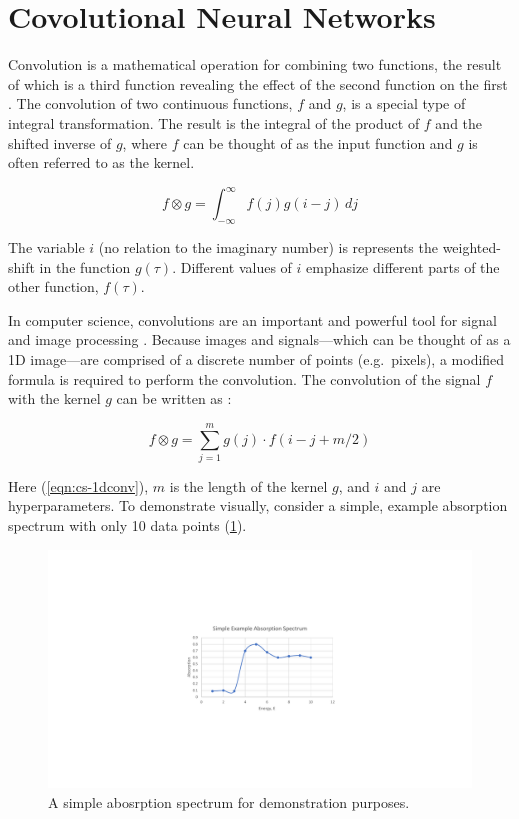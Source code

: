 \section{Covolutional Neural Networks}
Convolution is a mathematical operation for combining two functions, the result of which is a third function revealing the effect of the second function on the first \cite{Boas-mathmethods}. The convolution of two continuous functions, $ f $ and $ g $, is a special type of integral transformation. The result is the integral of the product of $ f $ and the shifted inverse of $ g $, where $ f $ can be thought of as the input function and $ g $ is often referred to as the kernel.

\begin{equation}
    f \otimes g = \int_{-\infty}^{\infty} f(j)g(i-j) \,dj 
\end{equation}

\noindent The variable $ i $ (no relation to the imaginary number) is represents the weighted-shift in the function $ g(\tau) $. Different values of $ i $ emphasize different parts of the other function, $ f(\tau) $.  

In computer science, convolutions are an important and powerful tool for signal and image processing \cite{1dconv-NN-survey} \cite{deepCNNforImages}. Because images and signals---which can be thought of as a 1D image---are comprised of a discrete number of points (e.g.~pixels), a modified formula is required to perform the convolution. The convolution of the signal $ f $ with the kernel $ g $ can be written as \cite{cornell-convs}:

\begin{equation}
    \label{eqn:cs-1dconv}
    f \otimes g = \sum_{j=1}^m g(j) \cdot  f(i-j+m/2)
\end{equation}

\noindent Here (\ref{eqn:cs-1dconv}), $ m $ is the length of the kernel $ g $, and $ i $ and $ j $ are hyperparameters. To demonstrate visually, consider a simple, example absorption spectrum with only 10 data points (\ref{fig:conv-ex-spectrum}).

\begin{figure}[h!]
    \centering
    \includegraphics[width=.75\linewidth]{Chapters/Figures/conv-example.pdf}
    \caption[Toy Absorption Spectrum]{A simple abosrption spectrum for demonstration purposes.}
    \label{fig:conv-ex-spectrum}
\end{figure}
 
